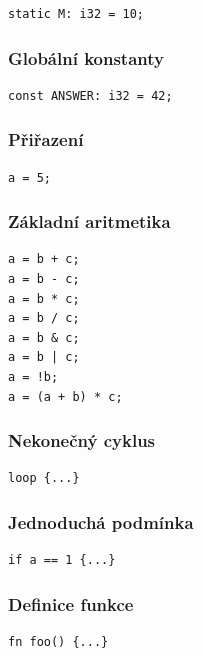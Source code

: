 \documentclass[12pt,a4paper]{article}
\begin{document}
\begin{verbatim}
static M: i32 = 10;
\end{verbatim}

\subsubsection*{Globální konstanty}

\begin{verbatim}
const ANSWER: i32 = 42;
\end{verbatim}

\subsubsection*{Přiřazení}

\begin{verbatim}
a = 5;
\end{verbatim}

\subsubsection*{Základní aritmetika}

\begin{verbatim}
a = b + c;
a = b - c;
a = b * c;
a = b / c;
a = b & c;
a = b | c;
a = !b;
a = (a + b) * c;
\end{verbatim}

\subsubsection*{Nekonečný cyklus}

\begin{verbatim}
loop {...}
\end{verbatim}

\subsubsection*{Jednoduchá podmínka}

\begin{verbatim}
if a == 1 {...}
\end{verbatim}

\subsubsection*{Definice funkce}

\begin{verbatim}
fn foo() {...}
\end{verbatim}
\end{document}
